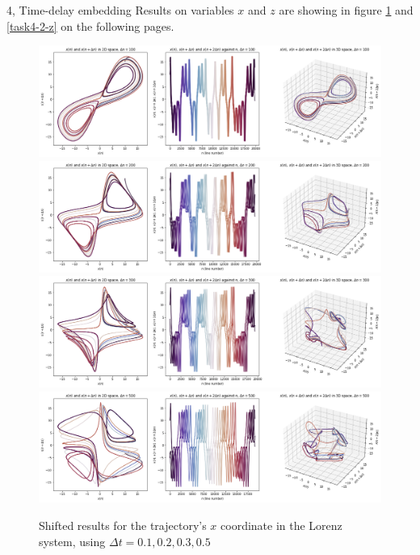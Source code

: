 \documentclass[10pt,a4paper]{article}
\begin{document}
\begin{task}{4, Time-delay embedding}
Results on variables $x$ and $z$ are showing in figure \ref{task4-2-x} and \ref{task4-2-z} on the following pages.

\begin{figure}[H]
    \centering
    \includegraphics[width=16cm]{images/task4-2-x-0.1.png}
    \includegraphics[width=16cm]{images/task4-2-x-0.2.png}
    \includegraphics[width=16cm]{images/task4-2-x-0.3.png}
    \includegraphics[width=16cm]{images/task4-2-x-0.5.png}
    \caption{Shifted results for the trajectory's $x$ coordinate in the Lorenz system, using $\Delta t=0.1, 0.2, 0.3, 0.5$}
    \label{task4-2-x}
\end{figure}


\end{task}
\end{document}
